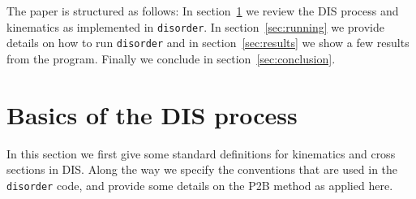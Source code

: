 \documentclass[submission, PhysCodeb]{SciPost}
\newcommand{\disorder}{{\tt disorder}}
\begin{document}
The paper is structured as follows: In section~\ref{sec:dis} we review
the DIS process and kinematics as implemented in \disorder{}. In
section~\ref{sec:running} we provide details on how to run \disorder{}
and in section~\ref{sec:results} we show a few results from the
program. Finally we conclude in section~\ref{sec:conclusion}.



\section{Basics of the DIS process}
\label{sec:dis}
In this section we first give some standard definitions for kinematics
and cross sections in DIS. Along the way we specify the conventions
that are used in the \disorder{} code, and provide some details on the
P2B method as applied here.
\end{document}
